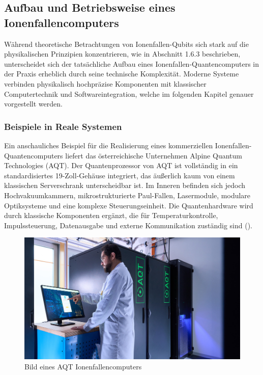 \subsection{Aufbau und Betriebsweise eines Ionenfallencomputers}

Während theoretische Betrachtungen von Ionenfallen-Qubits sich stark auf die physikalischen Prinzipien konzentrieren, wie in Abschnitt 1.6.3 beschrieben, unterscheidet sich der tatsächliche Aufbau eines Ionenfallen-Quantencomputers in der Praxis erheblich durch seine technische Komplexität. Moderne Systeme verbinden physikalisch hochpräzise Komponenten mit klassischer Computertechnik und Softwareintegration, welche im folgenden Kapitel genauer vorgestellt werden.
\subsubsection{Beispiele in Reale Systemen}

Ein anschauliches Beispiel für die Realisierung eines kommerziellen Ionenfallen-Quantencomputers liefert das österreichische Unternehmen Alpine Quantum Technologies (AQT). Der Quantenprozessor von AQT ist vollständig in ein standardisiertes 19-Zoll-Gehäuse integriert, das äußerlich kaum von einem klassischen Serverschrank unterscheidbar ist. Im Inneren befinden sich jedoch Hochvakuumkammern, mikrostrukturierte Paul-Fallen, Lasermodule, modulare Optiksysteme und eine komplexe Steuerungseinheit. Die Quantenhardware wird durch klassische Komponenten ergänzt, die für Temperaturkontrolle, Impulssteuerung, Datenausgabe und externe Kommunikation zuständig sind (\cite{bischoff_wettkampf_2024}).

    \begin{figure}[ht]
    \centering
    \includegraphics[width=1\textwidth]{images/quanten-hardware/AQT.jpg}
    \caption{Bild eines AQT Ionenfallencomputers}
    \label{fig:meinbild}
    \end{figure}

